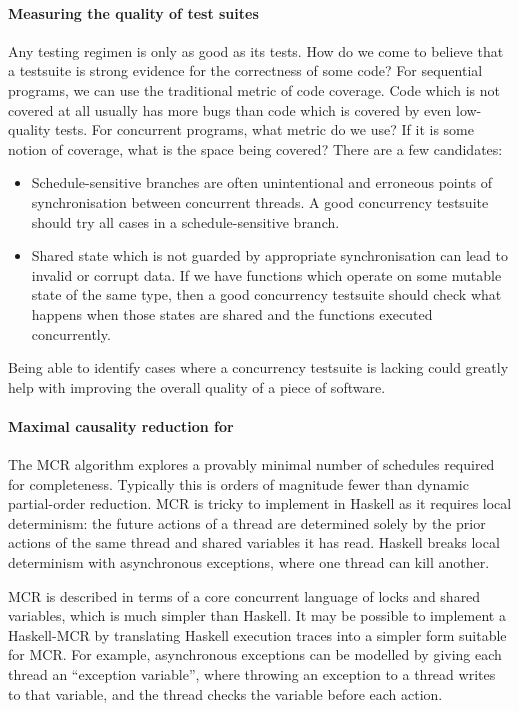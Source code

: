 \paragraph{Measuring the quality of test suites}
Any testing regimen is only as good as its tests.  How do we come to
believe that a testsuite is strong evidence for the correctness of
some code?  For sequential programs, we can use the traditional metric
of code coverage.  Code which is not covered at all usually has more
bugs than code which is covered by even low-quality
tests\cite{ahmed2016}.  For concurrent programs, what metric do we
use?  If it is some notion of coverage, what is the space being
covered?  There are a few candidates:

\begin{itemize}
\item Schedule-sensitive branches are often unintentional and
  erroneous points of synchronisation between concurrent
  threads\cite{huang2015ssb}.  A good concurrency testsuite should try
  all cases in a schedule-sensitive branch.

\item Shared state which is not guarded by appropriate synchronisation
  can lead to invalid or corrupt data.  If we have functions which
  operate on some mutable state of the same type, then a good
  concurrency testsuite should check what happens when those states
  are shared and the functions executed concurrently.
\end{itemize}

Being able to identify cases where a concurrency testsuite is lacking
could greatly help with improving the overall quality of a piece of
software.

\paragraph{Maximal causality reduction for \dejafu{}}
The MCR algorithm\cite{huang2015} explores a provably minimal number
of schedules required for completeness.  Typically this is orders of
magnitude fewer than dynamic partial-order reduction.  MCR is tricky
to implement in Haskell as it requires local determinism: the future
actions of a thread are determined solely by the prior actions of the
same thread and shared variables it has read.  Haskell breaks local
determinism with asynchronous exceptions, where one thread can kill
another.

MCR is described in terms of a core concurrent language of locks and
shared variables, which is much simpler than Haskell.  It may be
possible to implement a Haskell-MCR by translating Haskell execution
traces into a simpler form suitable for MCR\@.  For example,
asynchronous exceptions can be modelled by giving each thread an
``exception variable'', where throwing an exception to a thread writes
to that variable, and the thread checks the variable before each
action.

